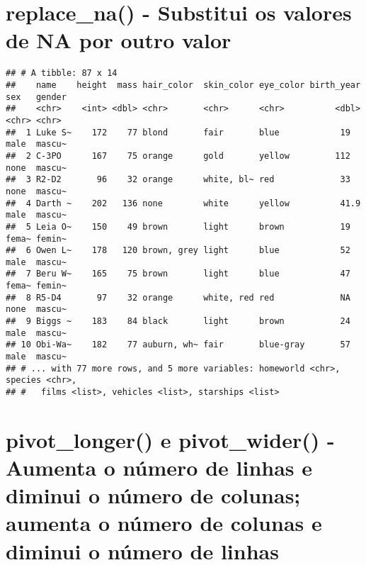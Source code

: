 \documentclass[]{book}
\newenvironment{Shaded}{\begin{snugshade}}{\end{snugshade}}
\newcommand{\DataTypeTok}[1]{\textcolor[rgb]{0.13,0.29,0.53}{#1}}
\newcommand{\KeywordTok}[1]{\textcolor[rgb]{0.13,0.29,0.53}{\textbf{#1}}}
\newcommand{\NormalTok}[1]{#1}
\newcommand{\OperatorTok}[1]{\textcolor[rgb]{0.81,0.36,0.00}{\textbf{#1}}}
\newcommand{\StringTok}[1]{\textcolor[rgb]{0.31,0.60,0.02}{#1}}
\begin{document}
\hypertarget{replace_na---substitui-os-valores-de-na-por-outro-valor}{%
\section{replace\_na() - Substitui os valores de NA por outro valor}\label{replace_na---substitui-os-valores-de-na-por-outro-valor}}

\begin{Shaded}
\end{Shaded}

\begin{verbatim}
## # A tibble: 87 x 14
##    name    height  mass hair_color  skin_color eye_color birth_year sex   gender
##    <chr>    <int> <dbl> <chr>       <chr>      <chr>          <dbl> <chr> <chr> 
##  1 Luke S~    172    77 blond       fair       blue            19   male  mascu~
##  2 C-3PO      167    75 orange      gold       yellow         112   none  mascu~
##  3 R2-D2       96    32 orange      white, bl~ red             33   none  mascu~
##  4 Darth ~    202   136 none        white      yellow          41.9 male  mascu~
##  5 Leia O~    150    49 brown       light      brown           19   fema~ femin~
##  6 Owen L~    178   120 brown, grey light      blue            52   male  mascu~
##  7 Beru W~    165    75 brown       light      blue            47   fema~ femin~
##  8 R5-D4       97    32 orange      white, red red             NA   none  mascu~
##  9 Biggs ~    183    84 black       light      brown           24   male  mascu~
## 10 Obi-Wa~    182    77 auburn, wh~ fair       blue-gray       57   male  mascu~
## # ... with 77 more rows, and 5 more variables: homeworld <chr>, species <chr>,
## #   films <list>, vehicles <list>, starships <list>
\end{verbatim}

\hypertarget{pivot_longer-e-pivot_wider---aumenta-o-nuxfamero-de-linhas-e-diminui-o-nuxfamero-de-colunas-aumenta-o-nuxfamero-de-colunas-e-diminui-o-nuxfamero-de-linhas}{%
\section{pivot\_longer() e pivot\_wider() - Aumenta o número de linhas e diminui o número de colunas; aumenta o número de colunas e diminui o número de linhas}\label{pivot_longer-e-pivot_wider---aumenta-o-nuxfamero-de-linhas-e-diminui-o-nuxfamero-de-colunas-aumenta-o-nuxfamero-de-colunas-e-diminui-o-nuxfamero-de-linhas}}
\end{document}
